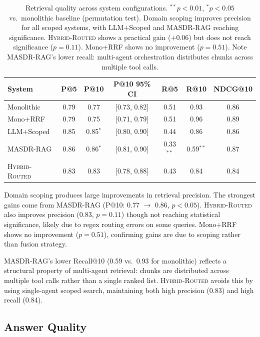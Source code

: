 \documentclass{article}
\newcommand{\systemname}{\textsc{MASDR-RAG}}
\newcommand{\hybridname}{\textsc{Hybrid-Routed}}
\newcommand{\sig}{$^{**}$}
\newcommand{\sigsingle}{$^{*}$}
\begin{document}
\begin{table}[H]
\centering
\small
\begin{tabular}{lcccccc}
\toprule
\textbf{System} & \textbf{P@5} & \textbf{P@10} & \textbf{P@10 95\% CI} & \textbf{R@5} & \textbf{R@10} & \textbf{NDCG@10} \\
\midrule
Monolithic & 0.79 & 0.77 & [0.73, 0.82] & 0.51 & 0.93 & 0.86 \\
Mono+RRF & 0.79 & 0.75 & [0.71, 0.79] & 0.51 & 0.96 & 0.89 \\
LLM+Scoped & 0.85 & 0.85\sigsingle & [0.80, 0.90] & 0.44 & 0.86 & 0.86 \\
\systemname{} & 0.86 & 0.86\sigsingle & [0.81, 0.90] & 0.33\sig & 0.59\sig & 0.87 \\
\hybridname{} & 0.83 & 0.83 & [0.78, 0.88] & 0.43 & 0.84 & 0.84 \\
\bottomrule
\end{tabular}
\caption{Retrieval quality across system configurations. \sig{}$p < 0.01$, \sigsingle{}$p < 0.05$ vs.\ monolithic baseline (permutation test). Domain scoping improves precision for all scoped systems, with LLM+Scoped and \systemname{} reaching significance. \hybridname{} shows a practical gain ($+$0.06) but does not reach significance ($p = 0.11$). Mono+RRF shows no improvement ($p = 0.51$). Note \systemname{}'s lower recall: multi-agent orchestration distributes chunks across multiple tool calls.}
\label{tab:retrieval}
\end{table}

Domain scoping produces large improvements in retrieval precision. The strongest gains come from \systemname{} (P@10: 0.77 $\rightarrow$ 0.86, $p < 0.05$). \hybridname{} also improves precision (0.83, $p = 0.11$) though not reaching statistical significance, likely due to regex routing errors on some queries. Mono+RRF shows no improvement ($p = 0.51$), confirming gains are due to scoping rather than fusion strategy.

\systemname{}'s lower Recall@10 (0.59 vs.\ 0.93 for monolithic) reflects a structural property of multi-agent retrieval: chunks are distributed across multiple tool calls rather than a single ranked list. \hybridname{} avoids this by using single-agent scoped search, maintaining both high precision (0.83) and high recall (0.84).

\subsection{Answer Quality}
\end{document}
